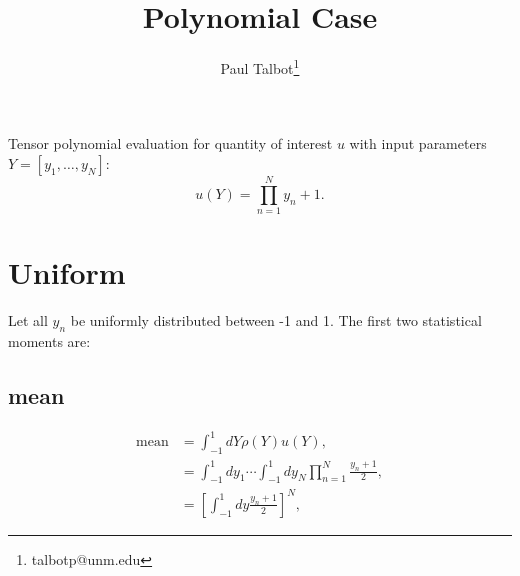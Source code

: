 \documentclass[11pt]{article}
\begin{document}
\title{Polynomial Case}

\author[]{Paul Talbot\thanks{talbotp@unm.edu}}
\date{}
\renewcommand\Authands{ and }
\maketitle

Tensor polynomial evaluation for quantity of interest $u$ with input parameters $Y=[y_1,\ldots,y_N]$:
\begin{equation}
u(Y) = \prod_{n=1}^N y_n+1.
\end{equation}

\section{Uniform}
Let all $y_n$ be uniformly distributed between -1 and 1.  The first two statistical moments are:
\subsection{mean}
\begin{align}
\text{mean}&=\int_{-1}^1 dY \rho(Y)u(Y),\\
  &=\int_{-1}^1 dy_1\cdots\int_{-1}^1 dy_N \prod_{n=1}^N \frac{y_n+1}{2},\\
  &=\left[ \int_{-1}^1 dy \frac{y_n+1}{2}\right]^N,
\end{align}
\end{document}

